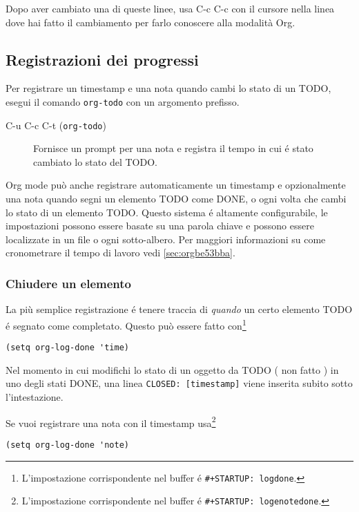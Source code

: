 \documentclass[11pt]{article}
\begin{document}
Dopo aver cambiato una di queste linee, usa C-c C-c con il
cursore nella linea dove hai fatto il cambiamento per farlo conoscere
alla modalità Org.

\subsection{Registrazioni dei progressi}
\label{sec:orgbe8daf9}
Per registrare un timestamp e una nota quando cambi lo stato di un
TODO, esegui il comando \texttt{org-todo} con un argomento prefisso.

\begin{description}
\item[{C-u C-c C-t (\texttt{org-todo})}] Fornisce un prompt per una nota e registra il tempo in cui é stato
cambiato lo stato del TODO.
\end{description}

Org mode può anche registrare automaticamente un timestamp e
opzionalmente una nota quando segni un elemento TODO come DONE, o ogni
volta che cambi lo stato di un elemento TODO. Questo sistema é
altamente configurabile, le impostazioni possono essere basate su una
parola chiave e possono essere localizzate in un file o ogni
sotto-albero. Per maggiori informazioni su come cronometrare il tempo
di lavoro vedi \ref{sec:orgbe53bba}.

\subsubsection*{Chiudere un elemento}
\label{sec:orge9b7363}
La più semplice registrazione é tenere traccia di \emph{quando} un certo
elemento TODO é segnato come completato. Questo può essere fatto
con\footnote{L'impostazione corrispondente nel buffer é \texttt{\#+STARTUP: logdone}.}

\begin{verbatim}
(setq org-log-done 'time)
\end{verbatim}

Nel momento in cui modifichi lo stato di un oggetto da TODO ( non
fatto ) in uno degli stati DONE, una linea \texttt{CLOSED: [timestamp]} viene
inserita subito sotto l'intestazione.

Se vuoi registrare una nota con il timestamp usa\footnote{L'impostazione corrispondente nel buffer é \texttt{\#+STARTUP:
logenotedone}.}

\begin{verbatim}
(setq org-log-done 'note)
\end{verbatim}
\end{document}
